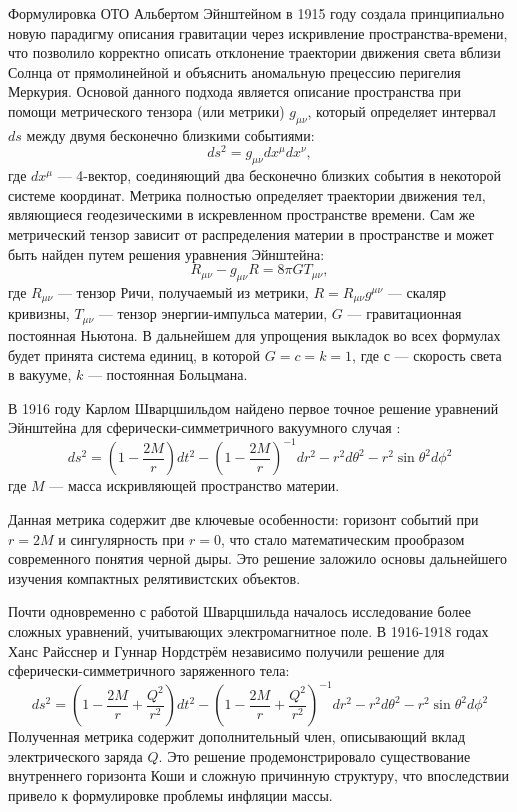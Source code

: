 Формулировка ОТО Альбертом Эйнштейном в 1915 году создала принципиально новую парадигму описания гравитации через искривление пространства-времени, что позволило корректно описать отклонение траектории движения света вблизи Солнца от прямолинейной и объяснить аномальную прецессию перигелия Меркурия. Основой данного подхода является описание пространства при помощи метрического тензора (или метрики) \(g_{\mu \nu}\), который определяет интервал \(ds\) между двумя бесконечно близкими событиями:
\begin{equation}
    \label{eq:general_interval}
    ds^2=g_{\mu \nu}dx^{\mu}dx^{\nu},
\end{equation}
где \(dx^{\mu}\) — 4-вектор, соединяющий два бесконечно близких события в некоторой системе координат.
Метрика полностью определяет траектории движения тел, являющиеся геодезическими в искревленном пространстве времени. Сам же метрический тензор зависит от распределения материи в пространстве и может быть найден путем решения уравнения Эйнштейна:
\begin{equation}
    \label{eq:Ein_Eq}
    R_{\mu \nu}-g_{\mu \nu}R=8\pi G T_{\mu \nu},
\end{equation}
где \(R_{\mu \nu}\) — тензор Ричи, получаемый из метрики, \(R=R_{\mu \nu}g^{\mu \nu}\) — скаляр кривизны, \(T_{\mu \nu}\) — тензор энергии-импульса материи, \(G\) — гравитационная постоянная Ньютона. В дальнейшем для упрощения выкладок во всех формулах  будет принята система единиц, в которой \(G=c=k=1\), где \(с\) — скорость света в вакууме, \(k\) — постоянная Больцмана.

В 1916 году Карлом Шварцшильдом найдено первое точное решение уравнений Эйнштейна для сферически-симметричного вакуумного случая \cite{schwarzschild1916gravitationsfeld}:
\begin{equation}
    \label{eq:Schw_metric}
    ds^2=(1-\frac{2M}{r})dt^2 - (1-\frac{2M}{r})^{-1}dr^2 - r^2d\theta^2 - r^2\sin{\theta}^2d\phi^2
\end{equation}
где \(M\) — масса искривляющей пространство материи.

Данная метрика содержит две ключевые особенности: горизонт событий при \(r = 2M\) и сингулярность при \(r = 0\), что стало математическим прообразом современного понятия черной дыры. Это решение заложило основы дальнейшего изучения компактных релятивистских объектов.

Почти одновременно с работой Шварцшильда началось исследование более сложных уравнений, учитывающих электромагнитное поле. В 1916-1918 годах Ханс Райсснер \cite{reissner1916eigengravitation} и Гуннар Нордстрём \cite{nordstrom1918energy} независимо получили решение для сферически-симметричного заряженного тела:
\begin{equation}
    \label{eq:Reis-Nord_metric}
    ds^2=(1-\frac{2M}{r} +\frac{Q^2}{r^2})dt^2 - (1-\frac{2M}{r}+\frac{Q^2}{r^2})^{-1}dr^2 - r^2d\theta^2 - r^2\sin{\theta}^2d\phi^2
\end{equation}
Полученная метрика содержит дополнительный член, описывающий вклад электрического заряда \(Q\). Это решение продемонстрировало существование внутреннего горизонта Коши и сложную причинную структуру, что впоследствии привело к формулировке проблемы инфляции массы.

